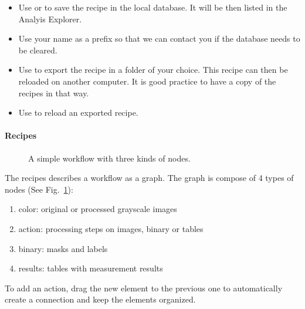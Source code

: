 \begin{itemize}
    \item Use  or  to save the recipe in the local database. It will be then listed in the Analyis Explorer.
    \item Use your name as a prefix so that we can contact you if the database needs to be cleared.
    \item Use  to export the recipe in a folder of your choice. This recipe can then be reloaded on another computer. It is good practice to have a copy of the recipes in that way.
    \item Use  to reload an exported recipe. 
\end{itemize}

\paragraph{Recipes}
\begin{figure}
    \centering \small
    \caption{A simple workflow with three kinds of nodes.}
    \label{fig:nodes}
\end{figure}

The recipes describes a workflow as a graph. The graph is compose of 4 types of nodes (See Fig.~\ref{fig:nodes}):
\begin{enumerate}\setlength\itemsep{0em}
    \item color: original or processed grayscale images
    \item action: processing steps on images, binary or tables
    \item binary: masks and labels
    \item results: tables with measurement results 
\end{enumerate}

To add an action, drag the new element to the previous one to automatically create a connection and keep the elements organized.

